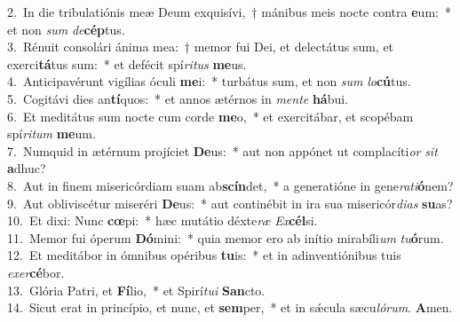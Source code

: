 {2.~}In die tribulatiónis meæ Deum exquisívi,~† mánibus meis nocte contra \textbf{e}um:~* et non \textit{sum} \textit{de}\textbf{cép}tus.\\
{3.~}Rénuit consolári ánima mea:~† memor fui Dei, et delectátus sum, et exerci\textbf{tá}tus sum:~* et defécit spí\textit{ri}\textit{tus} \textbf{me}us.\\
{4.~}Anticipavérunt vigílias óculi \textbf{me}i:~* turbátus sum, et non \textit{sum} \textit{lo}\textbf{cú}tus.\\
{5.~}Cogitávi dies an\textbf{tí}quos:~* et annos ætérnos in \textit{men}\textit{te} \textbf{há}bui.\\
{6.~}Et meditátus sum nocte cum corde \textbf{me}o,~* et exercitábar, et scopébam spí\textit{ri}\textit{tum} \textbf{me}um.\\
{7.~}Numquid in ætérnum projíciet \textbf{De}us:~* aut non appónet ut complacíti\textit{or} \textit{sit} \textbf{a}dhuc?\\
{8.~}Aut in finem misericórdiam suam ab\textbf{scín}det,~* a generatióne in gene\textit{ra}\textit{ti}\textbf{ó}nem?\\
{9.~}Aut obliviscétur miseréri \textbf{De}us:~* aut continébit in ira sua misericór\textit{di}\textit{as} \textbf{su}as?\\
{10.~}Et dixi: Nunc \textbf{cœ}pi:~* hæc mutátio déxte\textit{ræ} \textit{Ex}\textbf{cél}si.\\
{11.~}Memor fui óperum \textbf{Dó}mini:~* quia memor ero ab inítio mirabíli\textit{um} \textit{tu}\textbf{ó}rum.\\
{12.~}Et meditábor in ómnibus opéribus \textbf{tu}is:~* et in adinventiónibus tuis \textit{e}\textit{xer}\textbf{cé}bor.\\
{13.~}Glória Patri, et \textbf{Fí}lio,~* et Spirí\textit{tu}\textit{i} \textbf{San}cto.\\
{14.~}Sicut erat in princípio, et nunc, et \textbf{sem}per,~* et in sǽcula sæcu\textit{ló}\textit{rum}. \textbf{A}men.\\
